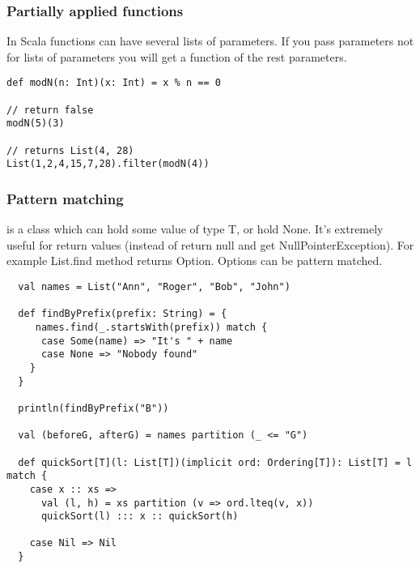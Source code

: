 \begin{frame}[fragile]
\frametitle{Partially applied functions}

In Scala functions can have several lists of parameters. If you pass parameters not for lists of parameters
you will get a function of the rest parameters.

\begin{example}
\begin{lstlisting}
def modN(n: Int)(x: Int) = x % n == 0

// return false
modN(5)(3)

// returns List(4, 28)
List(1,2,4,15,7,28).filter(modN(4))
\end{lstlisting}
\end{example}
\end{frame}

\begin{frame}[fragile]
\frametitle{Pattern matching}

 is a class which can hold some value of type T, or hold None. It's extremely useful for return values
(instead of return null and get NullPointerException). For example List.find method returns Option. Options can be pattern matched.

\begin{lstlisting}
  val names = List("Ann", "Roger", "Bob", "John")

  def findByPrefix(prefix: String) = {
     names.find(_.startsWith(prefix)) match {
      case Some(name) => "It's " + name
      case None => "Nobody found"
    }
  }

  println(findByPrefix("B"))

  val (beforeG, afterG) = names partition (_ <= "G")

  def quickSort[T](l: List[T])(implicit ord: Ordering[T]): List[T] = l match {
    case x :: xs => 
      val (l, h) = xs partition (v => ord.lteq(v, x))
      quickSort(l) ::: x :: quickSort(h)

    case Nil => Nil
  }
\end{lstlisting}

\end{frame}

